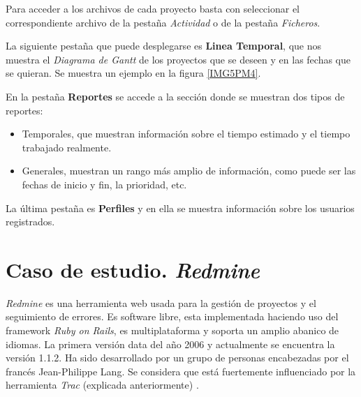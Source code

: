 \documentclass[11pt,a4paper,spanish,twoside]{report}
\begin{document}
      
        Para acceder a los archivos de cada proyecto basta con seleccionar el
        correspondiente archivo de la pestaña \emph{Actividad} o de la
        pestaña \emph{Ficheros}.

        La siguiente pestaña que puede desplegarse es \textbf{Linea
          Temporal}, que nos muestra el \emph{Diagrama de Gantt} de los
        proyectos que se deseen y en las fechas que se quieran. Se muestra un
        ejemplo en la figura \ref{IMG5PM4}.


        En la pestaña \textbf{Reportes} se accede a la sección donde se
        muestran dos tipos de reportes: 
        \begin{itemize}
          \item Temporales, que muestran información sobre el tiempo estimado
            y el tiempo trabajado realmente.

          \item Generales, muestran un rango más amplio de información, como
            puede ser las fechas de inicio y fin, la prioridad, etc.
        \end{itemize}

        La última pestaña es \textbf{Perfiles} y en ella se muestra
        información sobre los usuarios registrados.
        

\chapter{Caso de estudio. \emph{Redmine}}

\emph{Redmine} es una herramienta web usada para la gestión de proyectos y el
seguimiento de errores. Es software libre, esta implementada haciendo uso
del framework \emph{Ruby on Rails}, es multiplataforma y soporta un amplio
abanico de idiomas. La primera versión data del año 2006 y actualmente se
encuentra la versión 1.1.2. Ha sido desarrollado por un grupo de personas
encabezadas por el francés Jean-Philippe Lang. Se considera que está
fuertemente influenciado por la herramienta \emph{Trac} (explicada
anteriormente) \cite{RMI}.
\end{document}
